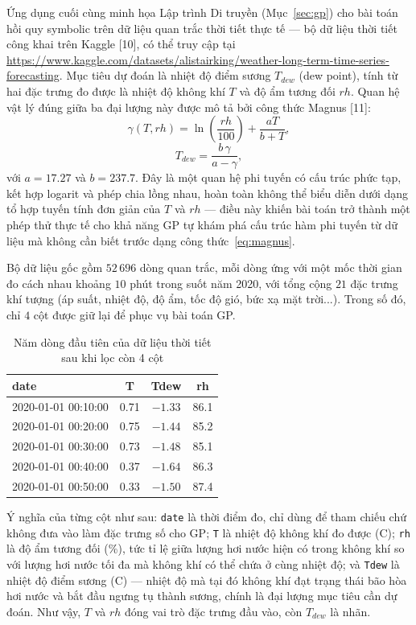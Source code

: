 Ứng dụng cuối cùng minh họa Lập trình Di truyền (Mục~\ref{sec:gp}) cho
bài toán hồi quy symbolic trên dữ liệu quan trắc thời tiết thực tế —
bộ dữ liệu thời tiết công khai trên Kaggle [10], có thể truy cập tại
\url{https://www.kaggle.com/datasets/alistairking/weather-long-term-time-series-forecasting}.
Mục tiêu dự đoán là
nhiệt độ điểm sương $T_{dew}$ (dew point), tính từ hai đặc trưng đo
được là nhiệt độ không khí $T$ và độ ẩm tương đối $rh$. Quan hệ vật lý
đúng giữa ba đại lượng này được mô tả bởi công thức Magnus [11]:
\begin{equation}
\gamma(T, rh) = \ln\!\left(\frac{rh}{100}\right) + \frac{aT}{b+T},
\label{eq:magnus-gamma}
\end{equation}
\begin{equation}
T_{dew} = \frac{b\,\gamma}{a-\gamma},
\label{eq:magnus}
\end{equation}
với $a=17.27$ và $b=237.7$. Đây là một quan hệ phi tuyến có cấu trúc
phức tạp, kết hợp logarit và phép chia lồng nhau, hoàn toàn không thể
biểu diễn dưới dạng tổ hợp tuyến tính đơn giản của $T$ và $rh$ — điều
này khiến bài toán trở thành một phép thử thực tế cho khả năng GP tự
khám phá cấu trúc hàm phi tuyến từ dữ liệu mà không cần biết trước
dạng công thức~\eqref{eq:magnus}.

Bộ dữ liệu gốc gồm $52\,696$ dòng quan trắc, mỗi dòng ứng với một mốc
thời gian đo cách nhau khoảng $10$ phút trong suốt năm 2020, với tổng
cộng $21$ đặc trưng khí tượng (áp suất, nhiệt độ, độ ẩm, tốc độ gió,
bức xạ mặt trời...). Trong số đó, chỉ $4$ cột được giữ lại để phục vụ
bài toán GP.

\begin{table}[H]
\centering
\caption{Năm dòng đầu tiên của dữ liệu thời tiết sau khi lọc còn 4 cột}
\label{tab:head-weather}
\begin{tabular}{lccc}
\toprule
\textbf{date} & \textbf{T} & \textbf{Tdew} & \textbf{rh} \\
\midrule
2020-01-01 00:10:00 & 0.71 & $-1.33$ & 86.1 \\
2020-01-01 00:20:00 & 0.75 & $-1.44$ & 85.2 \\
2020-01-01 00:30:00 & 0.73 & $-1.48$ & 85.1 \\
2020-01-01 00:40:00 & 0.37 & $-1.64$ & 86.3 \\
2020-01-01 00:50:00 & 0.33 & $-1.50$ & 87.4 \\
\bottomrule
\end{tabular}
\end{table}

Ý nghĩa của từng cột như sau: \texttt{date} là thời điểm đo, chỉ dùng
để tham chiếu chứ không đưa vào làm đặc trưng số cho GP; \texttt{T} là
nhiệt độ không khí đo được (\textdegree C); \texttt{rh} là độ ẩm tương
đối (\%), tức tỉ lệ giữa lượng hơi nước hiện có trong không khí so với
lượng hơi nước tối đa mà không khí có thể chứa ở cùng nhiệt độ; và
\texttt{Tdew} là nhiệt độ điểm sương (\textdegree C) — nhiệt độ mà tại
đó không khí đạt trạng thái bão hòa hơi nước và bắt đầu ngưng tụ thành
sương, chính là đại lượng mục tiêu cần dự đoán. Như vậy, $T$ và $rh$
đóng vai trò đặc trưng đầu vào, còn $T_{dew}$ là nhãn.

